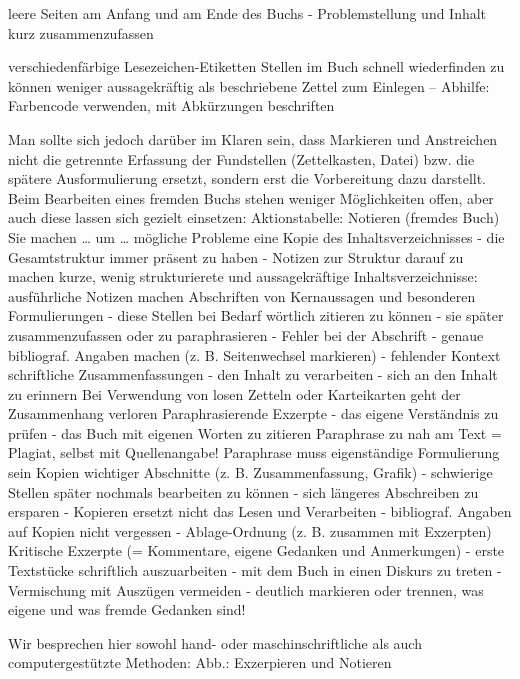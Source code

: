 \documentclass[]{book}
\theoremstyle{definition}
\theoremstyle{definition}
\theoremstyle{definition}
\theoremstyle{remark}
\begin{document}
leere Seiten am Anfang und am Ende des Buchs - Problemstellung und
Inhalt kurz zusammenzufassen

verschiedenfärbige Lesezeichen-Etiketten Stellen im Buch schnell
wiederfinden zu können weniger aussagekräftig als beschriebene Zettel
zum Einlegen -- Abhilfe: Farbencode verwenden, mit Abkürzungen
beschriften

Man sollte sich jedoch darüber im Klaren sein, dass Markieren und
Anstreichen nicht die getrennte Erfassung der Fundstellen (Zettelkasten,
Datei) bzw. die spätere Ausformulierung ersetzt, sondern erst die
Vorbereitung dazu darstellt. Beim Bearbeiten eines fremden Buchs stehen
weniger Möglichkeiten offen, aber auch diese lassen sich gezielt
einsetzen: Aktionstabelle: Notieren (fremdes Buch) Sie machen \ldots{}
um \ldots{} mögliche Probleme eine Kopie des Inhaltsverzeichnisses - die
Gesamtstruktur immer präsent zu haben - Notizen zur Struktur darauf zu
machen kurze, wenig strukturierete und aussagekräftige
Inhaltsverzeichnisse: ausführliche Notizen machen Abschriften von
Kernaussagen und besonderen Formulierungen - diese Stellen bei Bedarf
wörtlich zitieren zu können - sie später zusammenzufassen oder zu
paraphrasieren - Fehler bei der Abschrift - genaue bibliograf. Angaben
machen (z. B. Seitenwechsel markieren) - fehlender Kontext schriftliche
Zusammenfassungen - den Inhalt zu verarbeiten - sich an den Inhalt zu
erinnern Bei Verwendung von losen Zetteln oder Karteikarten geht der
Zusammenhang verloren Paraphrasierende Exzerpte - das eigene Verständnis
zu prüfen - das Buch mit eigenen Worten zu zitieren Paraphrase zu nah am
Text = Plagiat, selbst mit Quellenangabe! Paraphrase muss eigenständige
Formulierung sein Kopien wichtiger Abschnitte (z. B. Zusammenfassung,
Grafik) - schwierige Stellen später nochmals bearbeiten zu können - sich
längeres Abschreiben zu ersparen - Kopieren ersetzt nicht das Lesen und
Verarbeiten - bibliograf. Angaben auf Kopien nicht vergessen -
Ablage-Ordnung (z. B. zusammen mit Exzerpten) Kritische Exzerpte (=
Kommentare, eigene Gedanken und Anmerkungen) - erste Textstücke
schriftlich auszuarbeiten - mit dem Buch in einen Diskurs zu treten -
Vermischung mit Auszügen vermeiden - deutlich markieren oder trennen,
was eigene und was fremde Gedanken sind!

Wir besprechen hier sowohl hand- oder maschinschriftliche als auch
computergestützte Methoden: Abb.: Exzerpieren und Notieren
\end{document}
